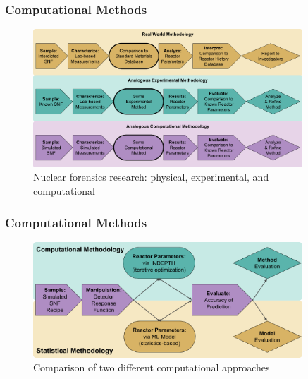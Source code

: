 
\begin{frame}
  \frametitle{Computational Methods}
  \begin{figure}[h!]
    \centering
    \includegraphics[width=0.9\textwidth]{./figures/ForensicsWorkflows.png}
    \caption{Nuclear forensics research: physical, experimental, and computational}
  \end{figure}
\end{frame}

\begin{frame}
  \frametitle{Computational Methods}
  \begin{figure}[h!]
    \centering
    \includegraphics[width=0.9\textwidth]{./figures/CompStatForensicsWorkflow.png}
    \caption{Comparison of two different computational approaches}
  \end{figure}
\end{frame}

